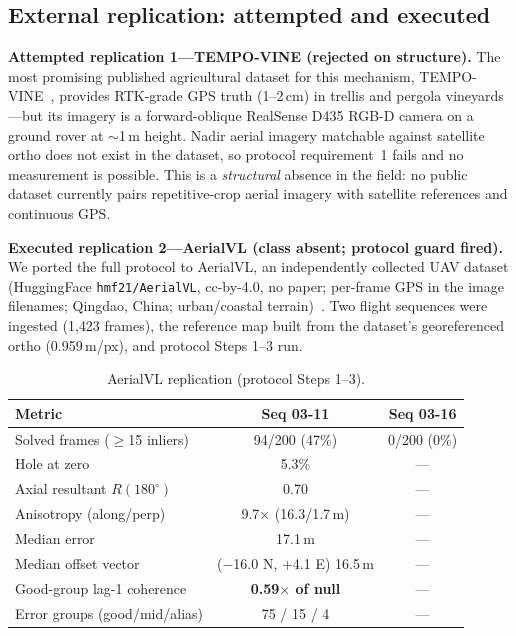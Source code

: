 \documentclass[journal]{IEEEtran}
\begin{document}
\subsection{External replication: attempted and executed}
\label{sec:replication}

\textbf{Attempted replication 1---TEMPO-VINE (rejected on structure).} The most promising published agricultural dataset for this mechanism, TEMPO-VINE~\cite{tempovine}, provides RTK-grade GPS truth (1--2\,cm) in trellis and pergola vineyards---but its imagery is a forward-oblique RealSense D435 RGB-D camera on a ground rover at $\sim$1\,m height. Nadir aerial imagery matchable against satellite ortho does not exist in the dataset, so protocol requirement~1 fails and no measurement is possible. This is a \emph{structural} absence in the field: no public dataset currently pairs repetitive-crop aerial imagery with satellite references and continuous GPS.

\textbf{Executed replication 2---AerialVL (class absent; protocol guard fired).} We ported the full protocol to AerialVL, an independently collected UAV dataset (HuggingFace \texttt{hmf21/AerialVL}, cc-by-4.0, no paper; per-frame GPS in the image filenames; Qingdao, China; urban/coastal terrain)~\cite{aerialvl}. Two flight sequences were ingested (1{,}423 frames), the reference map built from the dataset's georeferenced ortho (0.959\,m/px), and protocol Steps 1--3 run.

\begin{table}[t]
\caption{AerialVL replication (protocol Steps 1--3).}
\label{tab:aerialvl}
\centering
\footnotesize
\begin{tabular}{@{}lcc@{}}
\toprule
Metric & Seq 03-11 & Seq 03-16 \\
\midrule
Solved frames ($\geq$15 inliers) & 94/200 (47\%) & 0/200 (0\%) \\
Hole at zero & 5.3\% & --- \\
Axial resultant $R(180^{\circ})$ & 0.70 & --- \\
Anisotropy (along/perp) & 9.7$\times$ (16.3/1.7\,m) & --- \\
Median error & 17.1\,m & --- \\
Median offset vector & ($-$16.0 N, +4.1 E) 16.5\,m & --- \\
Good-group lag-1 coherence & \textbf{0.59$\times$ of null} & --- \\
Error groups (good/mid/alias) & 75 / 15 / 4 & --- \\
\bottomrule
\end{tabular}
\end{table}
\end{document}

